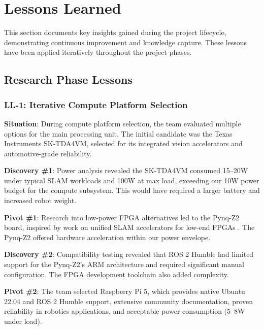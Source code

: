 
\section{Lessons Learned}

This section documents key insights gained during the project lifecycle, demonstrating continuous improvement and knowledge capture. These lessons have been applied iteratively throughout the project phases.

\subsection{Research Phase Lessons}

\subsubsection{LL-1: Iterative Compute Platform Selection}

\textbf{Situation}: During compute platform selection, the team evaluated multiple options for the main processing unit. The initial candidate was the Texas Instruments SK-TDA4VM, selected for its integrated vision accelerators and automotive-grade reliability.

\textbf{Discovery \#1}: Power analysis revealed the SK-TDA4VM consumed 15--20W under typical SLAM workloads and 100W at max load, exceeding our 10W power budget for the compute subsystem. This would have required a larger battery and increased robot weight.

\textbf{Pivot \#1}: Research into low-power FPGA alternatives led to the Pynq-Z2 board, inspired by work on unified SLAM accelerators for low-end FPGAs \parencite{sugiura_fpga_slam}. The Pynq-Z2 offered hardware acceleration within our power envelope.

\textbf{Discovery \#2}: Compatibility testing revealed that ROS 2 Humble had limited support for the Pynq-Z2's ARM architecture and required significant manual configuration. The FPGA development toolchain also added complexity.

\textbf{Pivot \#2}: The team selected Raspberry Pi 5, which provides native Ubuntu 22.04 and ROS 2 Humble support, extensive community documentation, proven reliability in robotics applications, and acceptable power consumption (5--8W under load).

